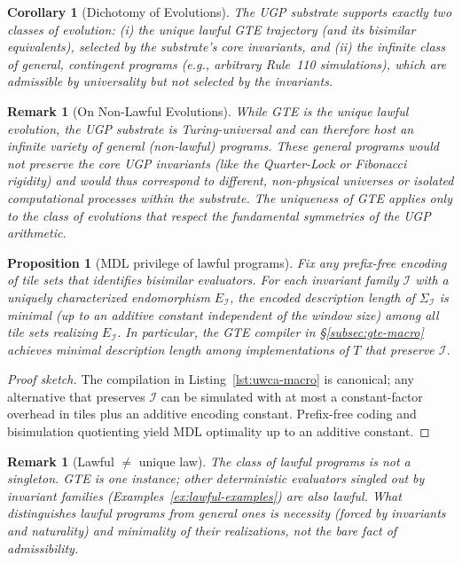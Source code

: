 \documentclass[12pt]{article}
\newtheorem{corollary}[theorem]{Corollary}
\newtheorem{proposition}[theorem]{Proposition}
\newtheorem{remark}[theorem]{Remark}
\numberwithin{equation}{section}
\begin{document}
\begin{corollary}[Dichotomy of Evolutions]
The UGP substrate supports exactly two classes of evolution: (i) the unique lawful GTE trajectory (and its bisimilar equivalents), selected by the substrate's core invariants, and (ii) the infinite class of general, contingent programs (e.g., arbitrary Rule~110 simulations), which are admissible by universality but not selected by the invariants.
\end{corollary}

\begin{remark}[On Non-Lawful Evolutions]
While GTE is the unique \emph{lawful} evolution, the UGP substrate is Turing-universal and can therefore host an infinite variety of \emph{general} (non-lawful) programs. These general programs would not preserve the core UGP invariants (like the Quarter-Lock or Fibonacci rigidity) and would thus correspond to different, non-physical universes or isolated computational processes within the substrate. The uniqueness of GTE applies only to the class of evolutions that respect the fundamental symmetries of the UGP arithmetic.
\end{remark}

\begin{proposition}[MDL privilege of lawful programs]\label{prop:lawful-mdl}
Fix any prefix-free encoding of tile sets that identifies bisimilar evaluators. For each invariant family $\mathcal{I}$ with a uniquely characterized endomorphism $E_{\mathcal{I}}$, the encoded description length of $\Sigma_{\mathcal{I}}$ is minimal (up to an additive constant independent of the window size) among all tile sets realizing $E_{\mathcal{I}}$. In particular, the GTE compiler in \S\ref{subsec:gte-macro} achieves minimal description length among implementations of $T$ that preserve $\mathcal{I}$.
\end{proposition}

\begin{proof}[Proof sketch]
The compilation in Listing~\ref{lst:uwca-macro} is canonical; any alternative that preserves $\mathcal{I}$ can be simulated with at most a constant-factor overhead in tiles plus an additive encoding constant. Prefix-free coding and bisimulation quotienting yield MDL optimality up to an additive constant.
\end{proof}

\begin{remark}[Lawful $\neq$ unique law]\label{rem:lawful-not-unique}
The class of lawful programs is not a singleton. GTE is one instance; other deterministic evaluators singled out by invariant families (Examples~\ref{ex:lawful-examples}) are also lawful. What distinguishes lawful programs from general ones is \emph{necessity} (forced by invariants and naturality) and \emph{minimality} of their realizations, not the bare fact of admissibility.
\end{remark}
\end{document}
